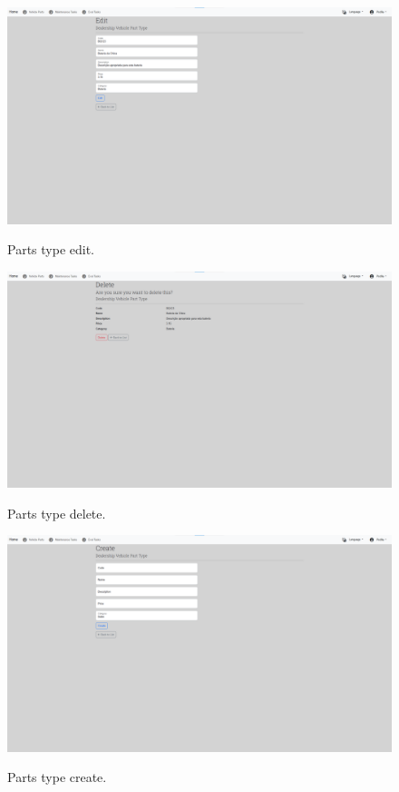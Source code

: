 \begin{figure}[htbp]
  \caption{Parts type edit.}
  \centering
  \includegraphics[width=\textwidth]{figs/Implementation/dealershipAdmin/partsEdit}
  \label{fig:partsEdit}
\end{figure}

\begin{figure}[htbp]
  \caption{Parts type delete.}
  \centering
  \includegraphics[width=\textwidth]{figs/Implementation/dealershipAdmin/partsDelete}
  \label{fig:partsDelete}
\end{figure}


\begin{figure}[htbp]
  \caption{Parts type create.}
  \centering
  \includegraphics[width=\textwidth]{figs/Implementation/dealershipAdmin/partsCreate}
  \label{fig:partsCreate}
\end{figure}



